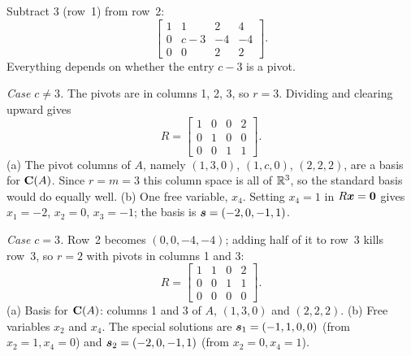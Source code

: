 \begin{solution}
Subtract $3$ (row~1) from row~2:
\[
  \begin{bmatrix}1&1&2&4\\0&c-3&-4&-4\\0&0&2&2\end{bmatrix}.
\]
Everything depends on whether the entry $c-3$ is a pivot.

\emph{Case $c\neq 3$.} The pivots are in columns 1, 2, 3, so $r=3$. Dividing and clearing
upward gives
\[
  R=\begin{bmatrix}1&0&0&2\\0&1&0&0\\0&0&1&1\end{bmatrix}.
\]
(a) The pivot columns of $A$, namely $(1,3,0)$, $(1,c,0)$, $(2,2,2)$, are a basis for
$\mathbf{C}(A)$. Since $r=m=3$ this column space is all of $\mathbb{R}^3$, so the standard basis would do
equally well.
(b) One free variable, $x_4$. Setting $x_4=1$ in $R\boldsymbol{x}=\boldsymbol{0}$ gives $x_1=-2$, $x_2=0$,
$x_3=-1$; the basis is $\boldsymbol{s}=(-2,0,-1,1)$.

\emph{Case $c=3$.} Row~2 becomes $(0,0,-4,-4)$; adding half of it to row~3 kills row~3, so
$r=2$ with pivots in columns 1 and 3:
\[
  R=\begin{bmatrix}1&1&0&2\\0&0&1&1\\0&0&0&0\end{bmatrix}.
\]
(a) Basis for $\mathbf{C}(A)$: columns 1 and 3 of $A$, $(1,3,0)$ and $(2,2,2)$.
(b) Free variables $x_2$ and $x_4$. The special solutions are
$\boldsymbol{s}_1=(-1,1,0,0)$ (from $x_2=1,x_4=0$) and $\boldsymbol{s}_2=(-2,0,-1,1)$ (from $x_2=0,x_4=1$).


\end{solution}
